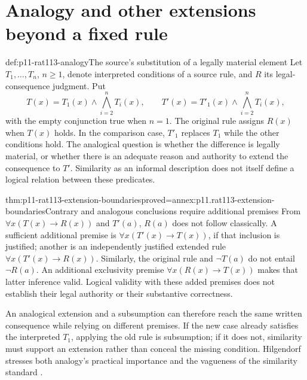 \section{Analogy and other extensions beyond a fixed rule}
\label{sec:p11-rat113-analogy}

\begin{hbdefinition}{def:p11-rat113-analogy}{The source's substitution of a legally material element}
Let \(T_1,\ldots,T_n\), \(n\geq1\), denote interpreted conditions
of a source rule, and \(R\) its legal-consequence judgment. Put
\[
 T(x)=T_1(x)\land\bigwedge_{i=2}^n T_i(x),\qquad
 T'(x)=T'_1(x)\land\bigwedge_{i=2}^n T_i(x),
\]
with the empty conjunction true when \(n=1\). The original rule assigns
\(R(x)\) when \(T(x)\) holds. In the comparison case, \(T'_1\)
replaces \(T_1\) while the other conditions hold. The analogical question
is whether the difference is legally material, or whether there is an
adequate reason and authority to extend the consequence to \(T'\).
Similarity as an informal description does not itself define a logical
relation between these predicates.
\end{hbdefinition}

\begin{hblemma}{thm:p11-rat113-extension-boundaries}{proved=annex:p11.rat113-extension-boundaries}{Contrary and analogous conclusions require additional premises}
From \(\forall x(T(x)\to R(x))\) and \(T'(a)\), \(R(a)\)
does not follow classically. A sufficient additional premise is
\(\forall x(T'(x)\to T(x))\), if that inclusion is justified; another
is an independently justified extended rule
\(\forall x(T'(x)\to R(x))\).
Similarly, the original rule and \(\neg T(a)\) do not entail
\(\neg R(a)\). An additional exclusivity premise
\(\forall x(R(x)\to T(x))\) makes that latter inference valid.
Logical validity with these added premises does not establish their legal
authority or their substantive correctness.
\end{hblemma}

An analogical extension and a subsumption can therefore reach the same
written consequence while relying on different premises. If the new case
already satisfies the interpreted \(T_1\), applying the old rule is
subsumption; if it does not, similarity must support an extension rather
than conceal the missing condition. Hilgendorf stresses both analogy's
practical importance and the vagueness of the similarity standard
\parencite[p.~664]{Hilgendorf2021LegalLogic}.

